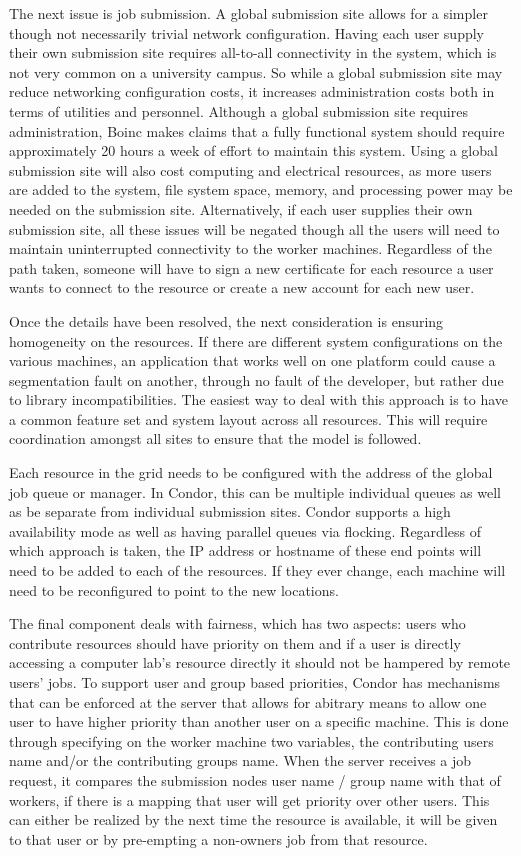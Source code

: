 \documentclass[conference]{IEEEtran}
\begin{document}
The next issue is job submission.  A global submission site allows for a
simpler though not necessarily trivial network configuration.  Having each user
supply their own submission site requires all-to-all connectivity in the
system, which is not very common on a university campus.  So while a global
submission site may reduce networking configuration costs, it increases
administration costs both in terms of utilities and personnel.  Although a
global submission site requires administration, Boinc makes claims that a fully
functional system should require approximately 20 hours a week of effort to
maintain this system.  Using a global submission site will also cost computing
and electrical resources, as more users are added to the system, file system
space, memory, and processing power may be needed on the submission site.
Alternatively, if each user supplies their own submission site, all these
issues will be negated though all the users will need to maintain uninterrupted
connectivity to the worker machines.  Regardless of the path taken, someone
will have to sign a new certificate for each resource a user wants to connect
to the resource or create a new account for each new user.

Once the details have been resolved, the next consideration is ensuring
homogeneity on the resources.  If there are different system configurations on
the various machines, an application that works well on one platform could
cause a segmentation fault on another, through no fault of the developer, but
rather due to library incompatibilities.  The easiest way to deal with this
approach is to have a common feature set and system layout across all
resources.  This will require coordination amongst all sites to ensure that the
model is followed.

Each resource in the grid needs to be configured with the address of the global
job queue or manager.  In Condor, this can be multiple individual queues as
well as be separate from individual submission sites.  Condor supports a high
availability mode as well as having parallel queues via flocking.  Regardless
of which approach is taken, the IP address or hostname of these end points will
need to be added to each of the resources.  If they ever change, each machine
will need to be reconfigured to point to the new locations.

The final component deals with fairness, which has two aspects:  users who
contribute resources should have priority on them and if a user is directly
accessing a computer lab's resource directly it should not be hampered by
remote users' jobs.  To support user and group based priorities, Condor has
mechanisms that can be enforced at the server that allows for abitrary means to
allow one user to have higher priority than another user on a specific machine.
This is done through specifying on the worker machine two variables, the
contributing users name and/or the contributing groups name.  When the server
receives a job request, it compares the submission nodes user name / group name
with that of workers, if there is a mapping that user will get priority over
other users.  This can either be realized by the next time the resource is
available, it will be given to that user or by pre-empting a non-owners job
from that resource.
\end{document}
